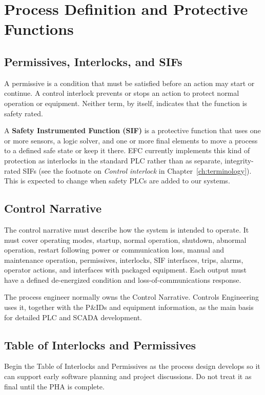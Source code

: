 \chapter{Process Definition and Protective Functions}
\section{Permissives, Interlocks, and SIFs}\label{sec:permissives-interlocks}
A permissive is a condition that must be satisfied before an action may start or continue. A control interlock prevents or stops an action to protect normal operation or equipment. Neither term, by itself, indicates that the function is safety rated.

A \textbf{Safety Instrumented Function (SIF)} is a protective function that uses one or more sensors, a logic solver, and one or more final elements to move a process to a defined safe state or keep it there. EFC currently implements this kind of protection as interlocks in the standard PLC rather than as separate, integrity-rated SIFs (see the footnote on \emph{Control interlock} in Chapter~\ref{ch:terminology}). This is expected to change when safety PLCs are added to our systems.

\section{Control Narrative}
The control narrative must describe how the system is intended to operate. It must cover operating modes, startup, normal operation, shutdown, abnormal operation, restart following power or communication loss, manual and maintenance operation, permissives, interlocks, SIF interfaces, trips, alarms, operator actions, and interfaces with packaged equipment. Each output must have a defined de-energized condition and loss-of-communications response.

The process engineer normally owns the Control Narrative. Controls Engineering uses it, together with the P\&IDs and equipment information, as the main basis for detailed PLC and SCADA development.

\section{Table of Interlocks and Permissives}
Begin the Table of Interlocks and Permissives as the process design develops so it can support early software planning and project discussions. Do not treat it as final until the PHA is complete.

